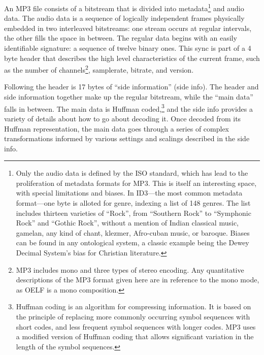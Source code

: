 \documentclass{thesis}
\begin{document}
An MP3 file consists of a bitstream that is divided into metadata\footnote{Only the audio data is defined by the ISO standard, which has lead to the proliferation of metadata formats for MP3. This is itself an interesting space, with special limitations and biases. In ID3---the most common metadata format---one byte is alloted for genre, indexing a list of 148 genres. The list includes thirteen varieties of ``Rock'', from ``Southern Rock'' to ``Symphonic Rock'' and ``Gothic Rock'', without a mention of Indian classical music, gamelan, any kind of chant, klezmer, Afro-cuban music, or baroque. Biases can be found in any ontological system, a classic example being the Dewey Decimal System's bias for Christian literature.} and audio data. The audio data is a sequence of logically independent frames physically embedded in two interleaved bitstreams: one stream occurs at regular intervals, the other fills the space in between. The regular data begins with an easily identifiable signature: a sequence of twelve binary ones. This sync is part of a 4 byte header that describes the high level characteristics of the current frame, such as the number of channels\footnote{MP3 includes mono and three types of stereo encoding. Any quantitative descriptions of the MP3 format given here are in reference to the mono mode, as OELF is a mono composition.}, samplerate, bitrate, and version.
	
Following the header is 17 bytes of ``side information'' (side info). The header and side information together make up the regular bitstream, while the ``main data'' falls in between. The main data is Huffman coded,\footnote{Huffman coding is an algorithm for compressing information. It is based on the principle of replacing more commonly occurring symbol sequences with short codes, and less frequent symbol sequences with longer codes. MP3 uses a modified version of Huffman coding that allows significant variation in the length of the symbol sequences.} and the side info provides a variety of details about how to go about decoding it. Once decoded from its Huffman representation, the main data goes through a series of complex transformations informed by various settings and scalings described in the side info.
\end{document}
